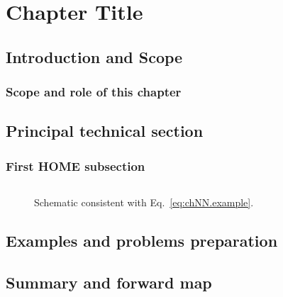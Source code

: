 \chapter{Chapter Title}
\label{ch:NN}


\section{Introduction and Scope}
\label{sec:chNN.0}


\subsection{Scope and role of this chapter}
\label{sec:chNN.0.1}


\section{Principal technical section}
\label{sec:chNN.1}

\subsection{First HOME subsection}
\label{sec:chNN.1.1}

\begin{equation}
\label{eq:chNN.example}
\end{equation}

\begin{figure}[t]
\centering
\caption{Schematic consistent with Eq.~\eqref{eq:chNN.example}.}
\label{fig:chNN.example}
\end{figure}

\section{Examples and problems preparation}
\label{sec:chNN.examples}

\section{Summary and forward map}
\label{sec:chNN.summary}


